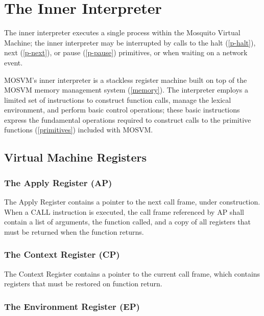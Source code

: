 \documentclass[notitlepage,oneside]{book}
\begin{document}
\chapter{The Inner Interpreter}

The inner interpreter executes a single process within the Mosquito Virtual Machine; the inner interpreter may be interrupted by calls to the halt (\ref{p-halt}), next (\ref{p-next}), or pause (\ref{p-pause}) primitives, or when waiting on a network event.

MOSVM's inner interpreter is a stackless register machine built on top of the MOSVM memory management system (\ref{memory}).  The interpreter employs a limited set of instructions to construct function calls, manage the lexical environment, and perform basic control operations; these basic instructions express the fundamental operations required to construct calls to the primitive functions (\ref{primitives}) included with MOSVM.

\section{Virtual Machine Registers}

\subsection{The Apply Register (AP)}
\label{r-ap}

The Apply Register contains a pointer to the next call frame, under construction.  When a CALL instruction is executed, the call frame referenced by AP shall contain a list of arguments, the function called, and a copy of all registers that must be returned when the function returns.

\subsection{The Context Register (CP)}
\label{r-cp}

The Context Register contains a pointer to the current call frame, which contains registers that must be restored on function return.

\subsection{The Environment Register (EP)}
\label{r-ep}
\end{document}
